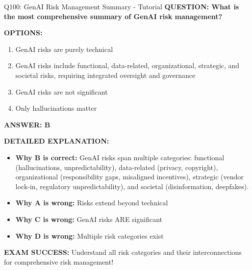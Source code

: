 \documentclass[8pt]{beamer}
\begin{document}
	\begin{frame}{Q100: GenAI Risk Management Summary - Tutorial}
		\fontsize{6.5}{7.5}\selectfont
		\textbf{QUESTION: What is the most comprehensive summary of GenAI risk management?}
		
		\vspace{0.1cm}
		\textbf{OPTIONS:}
		\begin{enumerate}
			\item GenAI risks are purely technical
			\item GenAI risks include functional, data-related, organizational, strategic, and societal risks, requiring integrated oversight and governance
			\item GenAI risks are not significant
			\item Only hallucinations matter
		\end{enumerate}
		
		\vspace{0.1cm}
		\textcolor{myblue}{\textbf{ANSWER: B}}
		
		\vspace{0.1cm}
		\textbf{DETAILED EXPLANATION:}
		\begin{itemize}
			\item \textbf{Why B is correct:} GenAI risks span multiple categories: functional (hallucinations, unpredictability), data-related (privacy, copyright), organizational (responsibility gaps, misaligned incentives), strategic (vendor lock-in, regulatory unpredictability), and societal (disinformation, deepfakes).
			\item \textbf{Why A is wrong:} Risks extend beyond technical
			\item \textbf{Why C is wrong:} GenAI risks ARE significant
			\item \textbf{Why D is wrong:} Multiple risk categories exist
		\end{itemize}
		
		\textcolor{myred}{\textbf{EXAM SUCCESS:}} Understand \textcolor{myblue}{all risk categories} and their interconnections for comprehensive risk management!
	\end{frame}
	
\end{document}
